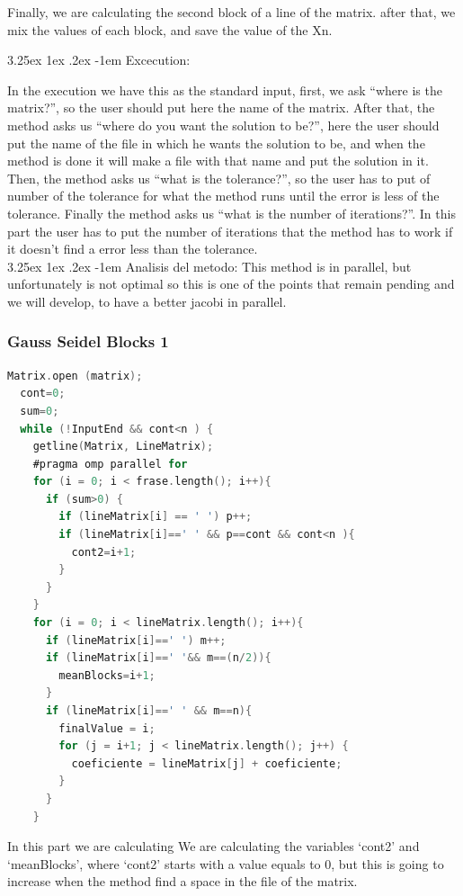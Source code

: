 \documentclass{article}
\makeatletter
\renewcommand\paragraph{\@startsection{paragraph}{5}{\z@}%
  {3.25ex \@plus1ex \@minus.2ex}%
  {-1em}%
  {\normalfont\normalsize\bfseries}}
\makeatother
\begin{document}
Finally, we are calculating the second block of a line of the matrix. after that, we mix the values of each block, and save the value of the Xn.
\newpage

\paragraph{Excecution:}
\hfill \break

In the execution we have this as the standard input,  first, we ask “where is the matrix?”, so the user should put here the name of the matrix. After that, the method asks us “where do you want the solution to be?”, here the user should put the name of the file in which he wants the solution to be, and when the method is done it will make a file with that name and put the solution in it. Then, the method asks us “what is the tolerance?”, so the user has to put of number of the tolerance for what the method runs until the error is less of the tolerance. Finally the method asks us “what is the number of iterations?”. In this part the user has to put the number of iterations that the method has to work if it doesn’t find a error less than the tolerance.\\


\paragraph{Analisis del metodo:}
\hfill \break
This method is in parallel, but unfortunately is not optimal so this is one of the points that remain pending and we will develop, to have a better jacobi in parallel.
\newpage
\subsubsection{Gauss Seidel Blocks 1}

\begin{lstlisting}[language=C]
  Matrix.open (matrix);
  cont=0;
  sum=0;
  while (!InputEnd && cont<n ) {
    getline(Matrix, LineMatrix);
    #pragma omp parallel for
    for (i = 0; i < frase.length(); i++){
      if (sum>0) {
        if (lineMatrix[i] == ' ') p++;
        if (lineMatrix[i]==' ' && p==cont && cont<n ){
          cont2=i+1;
        }
      }
    }
    for (i = 0; i < lineMatrix.length(); i++){
      if (lineMatrix[i]==' ') m++;
      if (lineMatrix[i]==' '&& m==(n/2)){
        meanBlocks=i+1;
      }
      if (lineMatrix[i]==' ' && m==n){
        finalValue = i;
        for (j = i+1; j < lineMatrix.length(); j++) {
          coeficiente = lineMatrix[j] + coeficiente;
        }
      }
    }
\end{lstlisting}
In this part we are calculating We are calculating the variables ‘cont2’ and ‘meanBlocks’, where ‘cont2’  starts with a value equals to 0, but this is going to increase when the method find a space in the file of the matrix.
\end{document}
